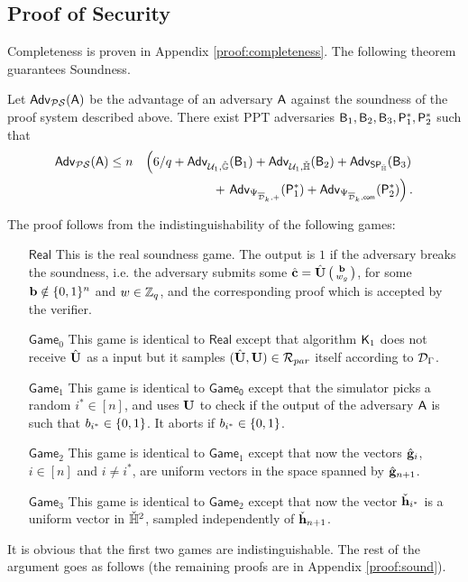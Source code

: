 %


\subsection{Proof of Security}

Completeness is proven in Appendix \ref{proof:completeness}.
The following theorem guarantees Soundness. 
 
\begin{theorem} Let $\mathsf{Adv}_{\mathcal{PS}}(\mathsf{A})$ 
be the advantage of an adversary $\mathsf{A}$ against the soundness of 
the proof system  described above. There exist PPT adversaries
$\mathsf{B}_1,\mathsf{B}_2,\mathsf{B}_3,\mathsf{P}^*_1,\mathsf{P}^*_2$ such that 
\begin{eqnarray*}
\mathsf{Adv}_{\mathcal{PS}}(\mathsf{A}) & \leq 
n& \left(6/q+ \mathsf{Adv}_{\mathcal{U}_1,{\hat{\mathbb{G}}}}(\mathsf{B}_1)
+  \mathsf{Adv}_{\mathcal{U}_1,{\check{\mathbb{H}}}}(\mathsf{B}_2)
+  \mathsf{Adv}_{\mathsf{SP}_{\check{\mathbb{H}}}}(\mathsf{B}_3)\right. \\
& & \mbox{ } 
+  \left.\mathsf{Adv}_{{\Psi_{\overline{\mathcal{D}}_k,+}}}(\mathsf{P}^*_1)
+
 \mathsf{Adv}_{{\Psi_{\overline{\mathcal{D}}_k,\mathsf{com}}}}(\mathsf{P}^*_2)\right).
\end{eqnarray*}
\label{teo:bitstr-soundness}
\end{theorem}

The proof follows from the indistinguishability of the following games:
\begin{itemize}
\item [$\mathsf{Real}$] This is the real soundness game. 
 The output is $1$ if  the adversary breaks the soundness,
i.e. the adversary submits
some ${\hat{\mathbf{c}}} = {\hat{\mathbf{{U}}}}\left(\begin{smallmatrix}\mathbf{b}\\ w_g\end{smallmatrix}\right)$, for some
$\mathbf{b}\notin \{0,1\}^n$ and $w \in \mathbb{Z}_q$, and
the corresponding proof which is accepted by the verifier.
\item[$\mathsf{Game}_0$] This game is identical to 
$\mathsf{Real}$ except that algorithm $\mathsf{K}_1$ does not receive ${\hat{\mathbf{{U}}}}$ as a input but it samples
$({\hat{\mathbf{{U}}}},\mathbf{{U}}) \in \mathcal{R}_{par}$
itself according to $\mathcal{D}_{\Gamma}$.
\item[$\mathsf{Game}_1$] This game is identical to 
$\mathsf{Game_0}$ except that the simulator picks a random $i^* \in [n]$, and uses $\mathbf{{U}}$ to check  
    if the output of the adversary $\mathsf{A}$ is such that 
    $b_{i^*}\in \{0,1\}$.  It aborts if  $b_{i^*}\in \{0,1\}$.
\item[$\mathsf{Game}_{2}$] This game is identical to 
$\mathsf{Game}_1$ except that now the vectors $\hat{\mathbf{g}}_{i}$, $i \in [n]$ and $i \neq i^*$,
are uniform vectors in the space spanned by $\hat{\mathbf{g}}_{n+1}$.   
\item[$\mathsf{Game}_{3}$] This game is identical to 
$\mathsf{Game}_2$ except that now the vector $\check{\mathbf{h}}_{i^*}$ is 
a uniform vector in ${\check{\mathbb{H}}}^2$, sampled independently of 
$\check{\mathbf{h}}_{n+1}$.     
\end{itemize}
It is obvious that the first two games are indistinguishable. 
The rest of the argument goes as follows (the remaining proofs are in Appendix \ref{proof:sound}). 


